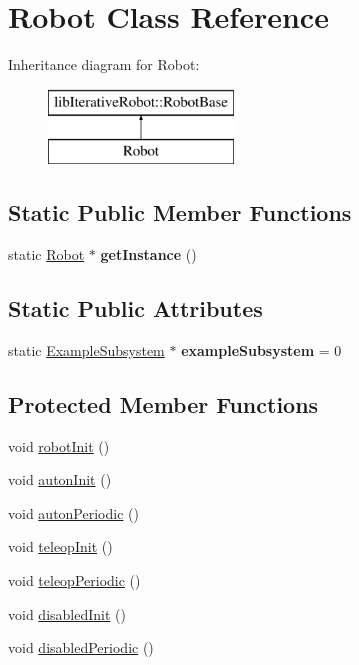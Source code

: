 \hypertarget{class_robot}{}\section{Robot Class Reference}
\label{class_robot}
Inheritance diagram for Robot\+:\begin{figure}[H]
\begin{center}
\leavevmode
\includegraphics[height=2.000000cm]{class_robot}
\end{center}
\end{figure}
\subsection*{Static Public Member Functions}
\begin{DoxyCompactItemize}
\item 
\mbox{\label{class_robot_ac6f19dc31b435f8a2d43944ba49286d0}} 
static \mbox{\hyperlink{class_robot}{Robot}} $\ast$ {\bfseries get\+Instance} ()
\end{DoxyCompactItemize}
\subsection*{Static Public Attributes}
\begin{DoxyCompactItemize}
\item 
\mbox{\label{class_robot_a64c0207f1f73a8a95b5c5dd4ba95209d}} 
static \mbox{\hyperlink{class_example_subsystem}{Example\+Subsystem}} $\ast$ {\bfseries example\+Subsystem} = 0
\end{DoxyCompactItemize}
\subsection*{Protected Member Functions}
\begin{DoxyCompactItemize}
\item 
void \mbox{\hyperlink{class_robot_a0ade19d412e58249d9f7a138d306130c}{robot\+Init}} ()
\item 
void \mbox{\hyperlink{class_robot_af5bd4d345ec522b70bdc5cf2b17ffa49}{auton\+Init}} ()
\item 
void \mbox{\hyperlink{class_robot_a51cab9afb43b369593ca189101b25b26}{auton\+Periodic}} ()
\item 
void \mbox{\hyperlink{class_robot_a8fc4fbb8f758d7223d062e1b4a915232}{teleop\+Init}} ()
\item 
void \mbox{\hyperlink{class_robot_a78f62f5d6eb05e27bfa1998fc35a519c}{teleop\+Periodic}} ()
\item 
void \mbox{\hyperlink{class_robot_a34f8bfa41ab64deae701c5583f619e78}{disabled\+Init}} ()
\item 
void \mbox{\hyperlink{class_robot_a9d35b3c9b4de467c7435d0cc6f17b33b}{disabled\+Periodic}} ()
\end{DoxyCompactItemize}
